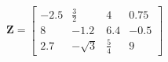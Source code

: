 
\[
\mathbf{Z} = 
\begin{bmatrix}
    -2.5 & \frac{3}{2} & 4 & 0.75 \\
    8 & -1.2 & 6.4 & -0.5 \\
    2.7 & -\sqrt{3} & \frac{5}{4} & 9
\end{bmatrix}
\]

